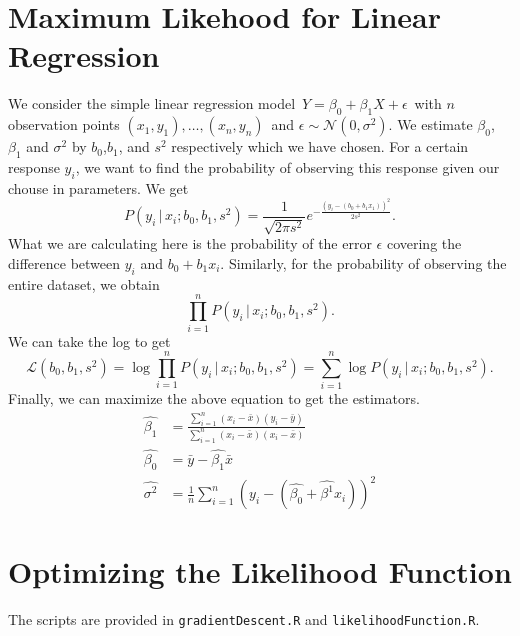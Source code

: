 \documentclass[12pt]{article}
\begin{document}
\pagestyle{fancy}
\renewcommand{\headrulewidth}{0pt}

\section{Maximum Likehood  for Linear Regression}
We consider the simple linear regression model $\,Y = \beta_0 + \beta_1X + \epsilon\,$ with $n$ observation points $(x_1, y_1), \dots ,(x_n, y_n)\,$ and $\epsilon \sim \mathcal{N}(0,\sigma^2)$. 
We estimate $\beta_0$, $\beta_1$ and $\sigma^2$ by $b_0$,$b_1$, and $s^2$ respectively which we have chosen. For a certain response $y_i$, we want to find the probability of observing this response 
given our chouse in parameters. We get 
\begin{equation*}
	P(y_i\, | \, x_i ; b_0, b_1, s^2) = \frac{1}{\sqrt{2\pi s^2}}e^{-\frac{(y_i - (b_0 + b_1x_1))^2}{2s^2}} .
\end{equation*}
What we are calculating here is the probability of the error $\epsilon$ covering the difference between $y_i$ and $ b_0 + b_1x_i$. Similarly, for the probability of observing the entire dataset, we obtain 
\begin{equation*}
	\prod\limits_{i=1}^n P(y_i\, | \, x_i ; b_0, b_1, s^2) .
\end{equation*}
We can take the log to get 
\begin{equation*}
\mathcal{L}(b_0,b_1,s^2) = \log \prod\limits_{i=1}^n P(y_i\, | \, x_i ; b_0, b_1, s^2) = \sum\limits_{i=1}^n \log P(y_i\, | \, x_i ; b_0, b_1, s^2).
\end{equation*}
Finally, we can maximize the above equation to get the estimators.
\begin{align*}
\hat{\beta_1} &= \frac{\sum\limits_{i=1}^n (x_i - \bar{x})(y_i - \bar{y})}{\sum\limits_{i=1}^n (x_i - \bar{x})(x_i - \bar{x})} \\
\hat{\beta_0} &= \bar{y} - \hat{\beta_1}\bar{x} \\
\hat{\sigma^2} &= \frac{1}{n} \sum \limits_{i=1}^n (y_i - (\hat{\beta_0} + \hat{\beta^1}x_i))^2
\end{align*}

\section{Optimizing the Likelihood Function}
The scripts are provided in \texttt{gradientDescent.R} and \texttt{likelihoodFunction.R}.
\end{document}
